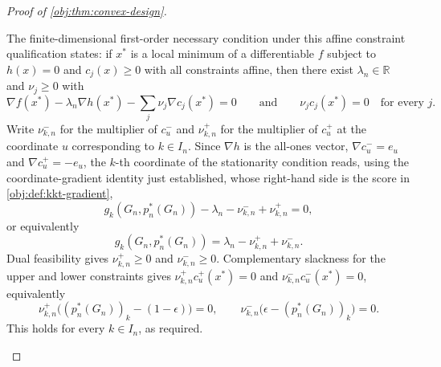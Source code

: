 \documentclass[11pt]{article}
\begin{document}
\begin{proof}[Proof of \cref{obj:thm:convex-design}]
\begin{enumerate}
The finite-dimensional first-order necessary condition under this affine constraint qualification states: if \(x^*\) is a local minimum of a differentiable \(f\) subject to \(h(x)=0\) and \(c_j(x)\ge0\) with all constraints affine, then there exist \(\lambda_n\in\mathbb R\) and \(\nu_j\ge0\) with
\[
\nabla f(x^*)-\lambda_n\nabla h(x^*)-\sum_j\nu_j\nabla c_j(x^*)=0
\qquad\text{and}\qquad
\nu_jc_j(x^*)=0\quad\text{for every }j.
\]
Write \(\nu^-_{k,n}\) for the multiplier of \(c^-_u\) and \(\nu^+_{k,n}\) for the multiplier of \(c^+_u\) at the coordinate \(u\) corresponding to \(k\in I_n\).  Since \(\nabla h\) is the all-ones vector, \(\nabla c_u^-=e_u\) and \(\nabla c_u^+=-e_u\), the \(k\)-th coordinate of the stationarity condition reads, using the coordinate-gradient identity just established, whose right-hand side is the score in \cref{obj:def:kkt-gradient},
\[
g_k(G_n,p_n^*(G_n))
-\lambda_n-\nu^-_{k,n}+\nu^+_{k,n}=0,
\]
or equivalently
\[
g_k(G_n,p_n^*(G_n))
=\lambda_n-\nu^+_{k,n}+\nu^-_{k,n}.
\]
Dual feasibility gives \(\nu^+_{k,n}\ge0\) and \(\nu^-_{k,n}\ge0\).  Complementary slackness for the upper and lower constraints gives \(\nu^+_{k,n}c_u^+(x^*)=0\) and \(\nu^-_{k,n}c_u^-(x^*)=0\), equivalently
\[
\nu^+_{k,n}\bigl((p_n^*(G_n))_k-(1-\epsilon)\bigr)=0,
\qquad
\nu^-_{k,n}\bigl(\epsilon-(p_n^*(G_n))_k\bigr)=0.
\]
This holds for every \(k\in I_n\), as required.
\end{enumerate}
\end{proof}
\end{document}

